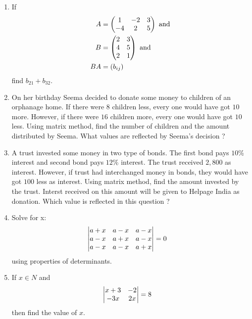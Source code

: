 \begin{enumerate}
    \item If
          \begin{align*}
              A  & =\begin{pmatrix}1      & -2 & 3 \\-4&2&5\end{pmatrix} \text{ and}\\
              B  & =\begin{pmatrix}2      & 3      \\4&5\\2&1\end{pmatrix} \text{ and}\\
              BA & =\left(b_{ij}\right)
          \end{align*}
          find $b_{21} + b_{32}$.
    \item On her birthday Seema decided to donate some money to children of an orphanage home. If there were $8$ children less, every one would have got \rupee $10$ more. However, if there were $16$ children more, every one would have got \rupee $10$ less. Using matrix method, find the number of children and the amount distributed by Seema. What values are reflected by Seema's decision ?
    \item A trust invested some money in two type of bonds. The first bond pays $10$\% interest and second bond pays $12$\% interest. The trust received \rupee $2,800$ as interest. However, if trust had interchanged money in bonds, they would have got \rupee $100$ less as interest. Using matrix method, find the amount invested by the trust. Interst received on this amount will be given to Helpage India as donation. Which value is reflected in this question ?
	\item Solve for x:
          \begin{align*}
              \begin{vmatrix}a+x & a-x & a-x \\a-x&a+x& a-x\\a-x & a-x & a+x\end{vmatrix} &=0
          \end{align*}
          using properties of determinants.
    \item If $x \in N$ and
          \begin{align*}
              \begin{vmatrix}x+3 & -2 \\ -3x & 2x\end{vmatrix} &= 8
          \end{align*}
          then find the value of $x$.


\end{enumerate}
